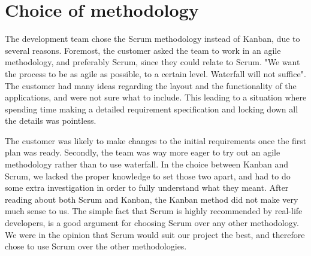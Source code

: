 \section{Choice of methodology}
\label{sec:choiceofmethodology}
The development team chose the Scrum methodology instead of Kanban, due to 
several reasons. Foremost, the customer asked the team to work in an agile methodology, and preferably Scrum, since they could relate to Scrum. 
"We want the process to be as agile as possible, to a certain level. Waterfall will not 
suffice". The customer had many ideas regarding the layout and the functionality of the 
applications, and were not sure what to include. This leading to a situation where 
spending time making a detailed requirement specification and locking down all the 
details was pointless.

The customer was likely to make changes to the initial requirements once the first plan 
was ready. Secondly, the team was way more eager to try out an agile methodology rather than to use waterfall. 
In the choice between Kanban and Scrum, we lacked the proper knowledge to set those two apart, and had to do some extra investigation in order to fully understand what they meant. After reading about both Scrum and Kanban, the Kanban method did not make very much sense to us. 
The simple fact that Scrum is highly recommended by real-life developers, is a good 
argument for choosing Scrum over any other methodology. We were in the opinion that Scrum would suit our project the best, and therefore chose to use Scrum over the other methodologies.

